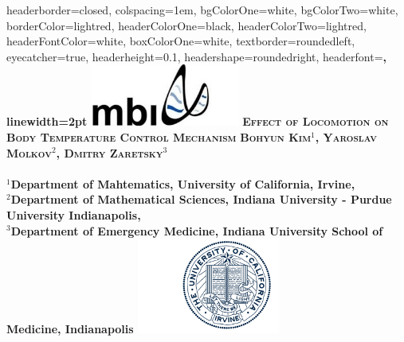 \documentclass[landscape,paperwidth=42in,paperheight=52in,fontscale=0.27]{baposter} %
\begin{document}
\begin{poster}
{
headerborder=closed, %
colspacing=1em, %
bgColorOne=white, %
bgColorTwo=white, %
borderColor=lightred, %
headerColorOne=black, %
headerColorTwo=lightred, %
headerFontColor=white, %
boxColorOne=white, %
textborder=roundedleft, %
eyecatcher=true, %
headerheight=0.1\textheight, %
headershape=roundedright, %
headerfont=\Large\bf\textsc, %
linewidth=2pt %
}
%
{\includegraphics[height=5.5em]{mbi_logo.jpg}} %
{\huge\bf\textsc{Effect of Locomotion on Body Temperature Control Mechanism}} %
{\small\bf\textsc{Bohyun Kim$^1$, Yaroslav Molkov$^2$, Dmitry Zaretsky$^3$}\\
\hrulefill\\
$^1${\scriptsize Department of Mahtematics, University of California, Irvine},\\ $^2${\scriptsize Department of Mathematical Sciences, Indiana University - Purdue University Indianapolis},\\ $^3${\scriptsize Department of Emergency Medicine, Indiana University School of Medicine, Indianapolis }} %
{\includegraphics[height=8.5em]{uci_logo.png}} %


\end{poster}
\end{document}
